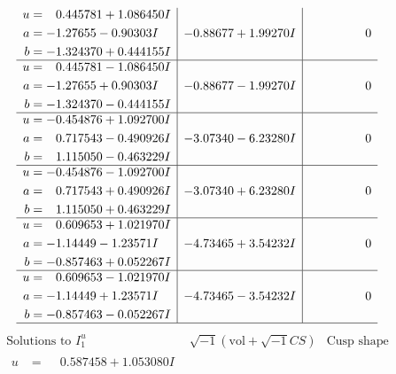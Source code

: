 \documentclass[1p]{elsarticle_modified}
\theoremstyle{definition}
\newcommand{\I}{\sqrt{-1}}
\begin{document}
$$\begin{array}{c|c|c}
\begin{aligned}
u &= \phantom{-}0.445781 + 1.086450 I \\
a &= -1.27655 - 0.90303 I \\
b &= -1.324370 + 0.444155 I\end{aligned}
 & -0.88677 + 1.99270 I & \phantom{-0.000000 } 0 \\ \hline\begin{aligned}
u &= \phantom{-}0.445781 - 1.086450 I \\
a &= -1.27655 + 0.90303 I \\
b &= -1.324370 - 0.444155 I\end{aligned}
 & -0.88677 - 1.99270 I & \phantom{-0.000000 } 0 \\ \hline\begin{aligned}
u &= -0.454876 + 1.092700 I \\
a &= \phantom{-}0.717543 - 0.490926 I \\
b &= \phantom{-}1.115050 - 0.463229 I\end{aligned}
 & -3.07340 - 6.23280 I & \phantom{-0.000000 } 0 \\ \hline\begin{aligned}
u &= -0.454876 - 1.092700 I \\
a &= \phantom{-}0.717543 + 0.490926 I \\
b &= \phantom{-}1.115050 + 0.463229 I\end{aligned}
 & -3.07340 + 6.23280 I & \phantom{-0.000000 } 0 \\ \hline\begin{aligned}
u &= \phantom{-}0.609653 + 1.021970 I \\
a &= -1.14449 - 1.23571 I \\
b &= -0.857463 + 0.052267 I\end{aligned}
 & -4.73465 + 3.54232 I & \phantom{-0.000000 } 0 \\ \hline\begin{aligned}
u &= \phantom{-}0.609653 - 1.021970 I \\
a &= -1.14449 + 1.23571 I \\
b &= -0.857463 - 0.052267 I\end{aligned}
 & -4.73465 - 3.54232 I & \phantom{-0.000000 } 0\\
 \hline 
 \end{array}$$\newpage$$\begin{array}{c|c|c}  
\text{Solutions to }I^u_{1}& \I (\text{vol} + \sqrt{-1}CS) & \text{Cusp shape}\\
 \hline 
\begin{aligned}
u &= \phantom{-}0.587458 + 1.053080 I \\

\end{aligned}
\end{array}$$
\end{document}
